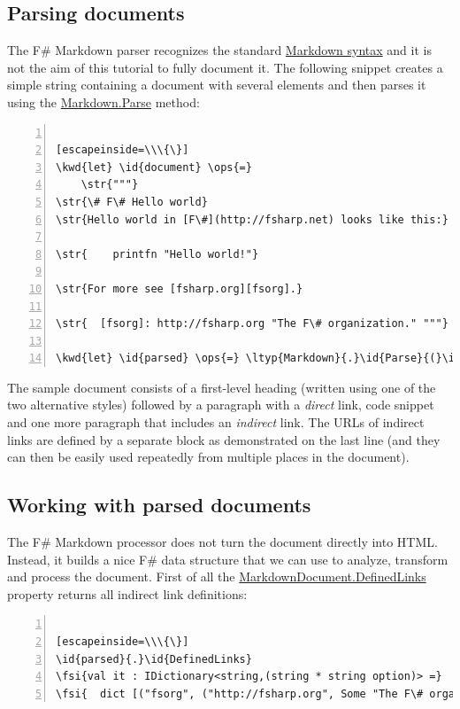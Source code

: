 \documentclass{article}
\newcommand{\id}[1]{\textcolor{black}{#1}}
\newcommand{\kwd}[1]{\textcolor{navy}{#1}}
\newcommand{\ops}[1]{\textcolor{purple}{#1}}
\newcommand{\str}[1]{\textcolor{olive}{#1}}
\newcommand{\fsi}[1]{\textcolor{outputcolor}{#1}}
\begin{document}
\subsection*{Parsing documents}



The F\# Markdown parser recognizes the standard \href{http://daringfireball.net/projects/markdown/}{Markdown syntax}
and it is not the aim of this tutorial to fully document it.
The following snippet creates a simple string containing a document
with several elements and then parses it using the \href{https://fsprojects.github.io/FSharp.Formatting/reference/fsharp-formatting-markdown-markdown.html}{Markdown.Parse} method:
\begin{lstlisting}[numbers=left]

[escapeinside=\\\{\}]
\kwd{let} \id{document} \ops{=}
    \str{"""}
\str{\# F\# Hello world}
\str{Hello world in [F\#](http://fsharp.net) looks like this:}

\str{    printfn "Hello world!"}

\str{For more see [fsharp.org][fsorg].}

\str{  [fsorg]: http://fsharp.org "The F\# organization." """}

\kwd{let} \id{parsed} \ops{=} \ltyp{Markdown}{.}\id{Parse}{(}\id{document}{)}

\end{lstlisting}



The sample document consists of a first-level heading (written using
one of the two alternative styles) followed by a paragraph with a
\emph{direct} link, code snippet and one more paragraph that includes an
\emph{indirect} link. The URLs of indirect links are defined by a separate
block as demonstrated on the last line (and they can then be easily used repeatedly
from multiple places in the document).
\subsection*{Working with parsed documents}



The F\# Markdown processor does not turn the document directly into HTML.
Instead, it builds a nice F\# data structure that we can use to analyze,
transform and process the document. First of all the \href{https://fsprojects.github.io/FSharp.Formatting/reference/fsharp-formatting-markdown-markdowndocument.html\#DefinedLinks}{MarkdownDocument.DefinedLinks} property
returns all indirect link definitions:
\begin{lstlisting}[numbers=left]

[escapeinside=\\\{\}]
\id{parsed}{.}\id{DefinedLinks}
\fsi{val it : IDictionary<string,(string * string option)> =}
\fsi{  dict [("fsorg", ("http://fsharp.org", Some "The F\# organization."))]}

\end{lstlisting}
\end{document}
